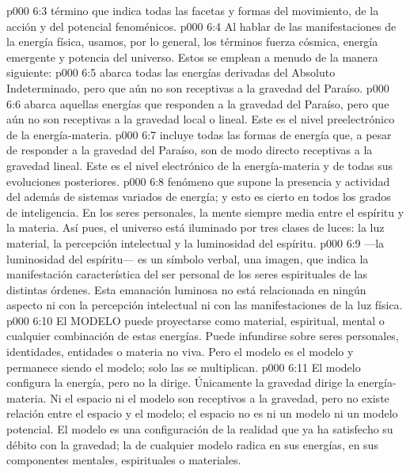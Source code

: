 \vs p000 6:3 \pc {} término que indica todas las facetas y formas del movimiento, de la acción y del potencial fenoménicos.
\vs p000 6:4 Al hablar de las manifestaciones de la energía física, usamos, por lo general, los términos fuerza cósmica, energía emergente y potencia del universo. Estos se emplean a menudo de la manera siguiente:
\vs p000 6:5  abarca todas las energías derivadas del Absoluto Indeterminado, pero que aún no son receptivas a la gravedad del Paraíso.
\vs p000 6:6  abarca aquellas energías que responden a la gravedad del Paraíso, pero que aún no son receptivas a la gravedad local o lineal. Este es el nivel preelectrónico de la energía\hyp{}materia.
\vs p000 6:7  incluye todas las formas de energía que, a pesar de responder a la gravedad del Paraíso, son de modo directo receptivas a la gravedad lineal. Este es el nivel electrónico de la energía\hyp{}materia y de todas sus evoluciones posteriores.
\vs p000 6:8 \pc {} fenómeno que supone la presencia y actividad del  además de sistemas variados de energía; y esto es cierto en todos los grados de inteligencia. En los seres personales, la mente siempre media entre el espíritu y la materia. Así pues, el universo está iluminado por tres clases de luces: la luz material, la percepción intelectual y la luminosidad del espíritu.
\vs p000 6:9 \pc {} ---la luminosidad del espíritu--- es un símbolo verbal, una imagen, que indica la manifestación característica del ser personal de los seres espirituales de las distintas órdenes. Esta emanación luminosa no está relacionada en ningún aspecto ni con la percepción intelectual ni con las manifestaciones de la luz física.
\vs p000 6:10 \pc El MODELO puede proyectarse como material, espiritual, mental o cualquier combinación de estas energías. Puede infundirse sobre seres personales, identidades, entidades o materia no viva. Pero el modelo es el modelo y permanece siendo el modelo; solo las  se multiplican.
\vs p000 6:11 El modelo configura la energía, pero no la dirige. Únicamente la gravedad dirige la energía\hyp{}materia. Ni el espacio ni el modelo son receptivos a la gravedad, pero no existe relación entre el espacio y el modelo; el espacio no es ni un modelo ni un modelo potencial. El modelo es una configuración de la realidad que ya ha satisfecho su débito con la gravedad; la  de cualquier modelo radica en sus energías, en sus componentes mentales, espirituales o materiales.
